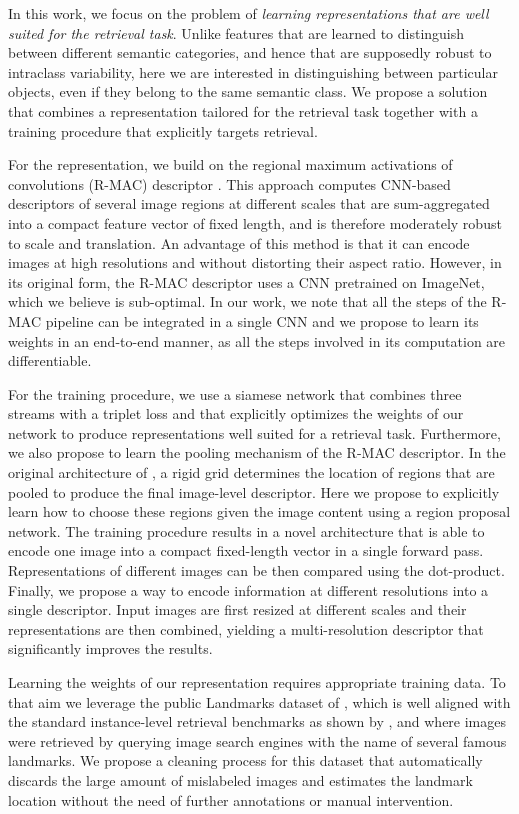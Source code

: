 \documentclass[twocolumn]{svjour3}          \smartqed  \usepackage{graphicx}
\begin{document}
In this work, we focus on the problem of \textit{learning representations that are well suited for the retrieval task}. Unlike features that are learned to distinguish between different semantic categories, and hence that are supposedly robust to intraclass variability, here we are interested in distinguishing between particular objects, even if they belong to the same semantic class. We propose a solution that combines a representation tailored for the retrieval task together with a training procedure that explicitly targets retrieval. 

For the representation, we build on the regional maximum activations of convolutions (R-MAC) descriptor \citep{Tolias2016}. 
This approach computes CNN-based descriptors of several image regions at different scales that are sum-aggregated into a compact feature vector of fixed length, and is therefore moderately robust to scale and translation.
An advantage of this method is that it can encode images at high resolutions and without distorting their aspect ratio.
However, in its original form, the R-MAC descriptor uses a CNN pretrained on ImageNet, which we believe is sub-optimal.
In our work, we note that all the steps of the R-MAC pipeline can be integrated in a single CNN and we propose to learn its weights in an end-to-end manner, as all the steps involved in its computation are differentiable. 

For the training procedure, we use a siamese network that combines three streams with a triplet loss and that explicitly optimizes the weights of our network to produce representations well suited for a retrieval task.
Furthermore, we also propose to learn the pooling mechanism of the R-MAC descriptor.
In the original architecture of \cite{Tolias2016}, a rigid grid determines the location of regions that are pooled to produce the final image-level descriptor. Here we propose to explicitly learn how to choose these regions given the image content using a region proposal network.
The training procedure results in a novel architecture that is able to encode one image into a compact fixed-length vector in a single forward pass. Representations of different images can be then compared using the dot-product.
Finally, we propose a way to encode information at different resolutions into a single descriptor. Input images are first resized at different scales and their representations are then combined, yielding a multi-resolution descriptor that significantly improves the results.


Learning the weights of our representation requires appropriate training data. To that aim we leverage the public Landmarks dataset of \cite{Babenko2014}, which is well aligned with the standard instance-level retrieval benchmarks as shown by \cite{Babenko2014}, and where images were retrieved by querying image search engines with the name of several famous landmarks. We propose a cleaning process for this dataset that automatically discards the large amount of mislabeled images and estimates the landmark location without the need of further annotations or manual intervention.
\end{document}
